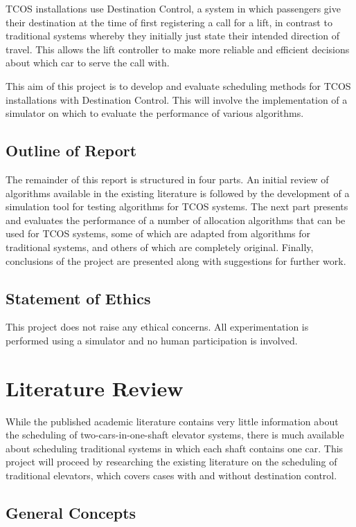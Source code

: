 \documentclass{UoYCSproject}
\begin{document}
TCOS installations use Destination Control, a system in which passengers give their destination at the time of first registering a call for a lift, in contrast to traditional systems whereby they initially just state their intended direction of travel.  This allows the lift controller to make more reliable and efficient decisions about which car to serve the call with.

This aim of this project is to develop and evaluate scheduling methods for TCOS installations with Destination Control.  This will involve the implementation of a simulator on which to evaluate the performance of various algorithms.

\section{Outline of Report}

The remainder of this report is structured in four parts.  An initial review of algorithms available in the existing literature is followed by the development of a simulation tool for testing algorithms for TCOS systems.  The next part presents and evaluates the performance of a number of allocation algorithms that can be used for TCOS systems, some of which are adapted from algorithms for traditional systems, and others of which are completely original.  Finally, conclusions of the project are presented along with suggestions for further work.

\section{Statement of Ethics}

This project does not raise any ethical concerns.  All experimentation is performed using a simulator and no human participation is involved.

\chapter{Literature Review}

While the published academic literature contains very little information about the scheduling of two-cars-in-one-shaft elevator systems, there is much available about scheduling traditional systems in which each shaft contains one car.  This project will proceed by researching the existing literature on the scheduling of traditional elevators, which covers cases with and without destination control.

\section{General Concepts}
\end{document}

